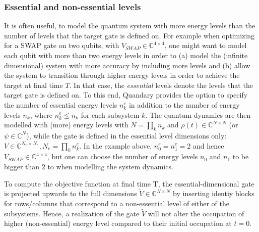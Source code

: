\documentclass[11pt]{article}
\newcommand{\C}{\mathds{C}}
\begin{document}
\subsubsection{Essential and non-essential levels} \label{sec:essentiallevels}
It is often useful, to model the quantum system with more energy levels than the number of levels that the target gate is defined on. For example when optimizing for a SWAP gate on two qubits, with $V_{SWAP}\in\C^{4\times 4}$, one might want to model each qubit with more than two energy levels in order to (a) model the (infinite dimensional) system with more accuracy by including more levels and (b) allow the system to transition through higher energy levels in order to achieve the target at final time $T$. In that case, the \textit{essential} levels denote the levels that the target gate is defined on.
To this end, Quandary provides the option to specify the number of essential energy levels $n_k^e$ in addition to the number of energy levels $n_k$, where $n_k^e \leq n_k$ for each subsystem $k$. The quantum dynamics are then modelled with (more) energy levels with $N=\prod_k n_k$ and $\rho(t)\in \C^{N\times N}$ (or $\psi\in\C^N$), while the gate is defined in the essential level dimensions only: $V\in \C^{N_e \times N_e}, N_e=\prod_k n_k^e$. In the example above, $n^e_0=n^e_1=2$ and hence $V_{SWAP}\in \C^{4\times 4}$, but one can choose the number of energy levels $n_0$ and $n_1$ to be bigger than $2$ to when modelling the system dynamics. 
 
To compute the objective function at final time T, the essential-dimensional gate is projected upwards to the full dimensions $\tilde V \in \C^{N\times N}$ by inserting identiy blocks for rows/columns that correspond to a non-essential level of either of the subsystems. Hence, a realization of the gate $\tilde V$ will not alter the occupation of higher (non-essential) energy level compared to their initial occupation at $t=0$. 

 
\end{document}

